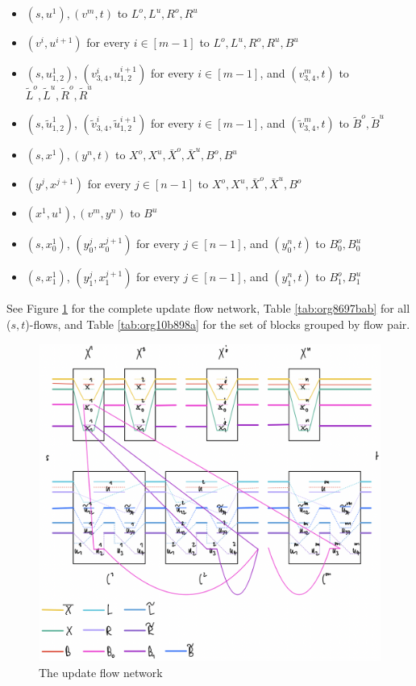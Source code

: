 \documentclass[fontsize=11pt,paper=a4]{book}
\begin{document}
\begin{itemize}
\item \((s,u^1),(v^m,t)\) to \(L^o,L^u,R^o,R^u\)
\item \((v^i,u^{i+1})\) for every \(i\in[m-1]\) to \(L^o,L^u,R^o,R^u,B^u\)
\item \((s,u_{1,2}^1)\), \((v_{3,4}^i,u_{1,2}^{i+1})\) for every \(i\in[m-1]\), and \((v_{3,4}^m,t)\) to \(\tilde{L}^o,\tilde{L}^u,\tilde{R}^o,\tilde{R}^u\)
\item \((s,\tilde{u}_{1,2}^1)\), \((\tilde{v}_{3,4}^i,\tilde{u}_{1,2}^{i+1})\) for every \(i\in[m-1]\), and \((\tilde{v}_{3,4}^m,t)\) to \(\tilde{B}^o,\tilde{B}^u\)
\item \((s,x^1),(y^n,t)\) to \(X^o,X^u,\bar{X}^o,\bar{X}^u,B^o,B^u\)
\item \((y^j,x^{j+1})\) for every \(j\in[n-1]\) to \(X^o,X^u,\bar{X}^o,\bar{X}^u,B^o\)
\item \((x^1,u^1),(v^m,y^n)\) to \(B^u\)
\item \((s,x_0^1)\), \((y_0^j,x_0^{j+1})\) for every \(j\in[n-1]\), and \((y_0^n,t)\) to \(B_0^o,B_0^u\)
\item \((s,x_1^1)\), \((y_1^j,x_1^{j+1})\) for every \(j\in[n-1]\), and \((y_1^n,t)\) to \(B_1^o,B_1^u\)
\end{itemize}

See Figure \ref{fig:org01cc568} for the complete update flow network, Table \ref{tab:org8697bab} for all (\(s,t\))-flows, and Table \ref{tab:org10b898a} for the set of blocks grouped by flow pair.

\begin{figure}[htbp]
\centering
\includegraphics[width=.9\linewidth]{../assets/Screen Shot 2023-02-14 at 15.08.01.png}
\caption{\label{fig:org01cc568}The update flow network}
\end{figure}
\end{document}
